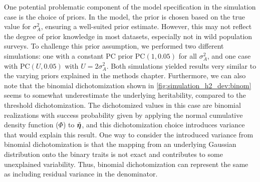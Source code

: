 One potential problematic component of the model specification in the simulation case is the choice of priors. In the model, the prior is chosen based on the true value for $\sigma^2_A$, ensuring a well-suited prior estimate. However, this may not reflect the degree of prior knowledge in most datasets, especially not in wild population surveys. To challenge this prior assumption, we performed two different simulations: one with a constant PC prior PC$(1,0.05)$ for all $\sigma^2_A$, and one case with PC$(U, 0.05)$ with $U=2\sigma^2_A$. Both simulations yielded results very similar to the varying priors explained in the methods chapter. %
Furthermore, we can also note that the binomial dichotomization shown in \autoref{fig:simulation_h2_dev:binom} seems to somewhat underestimate the underlying heritability, compared to the threshold dichotomization. The dichotomized values in this case are binomial realizations with success probability given by applying the normal cumulative density function ($\Phi$) to $\Tilde{\bm\eta}$, and this dichotomization choice introduces variance that would explain this result. One way to consider the introduced variance from binomial dichotomization is that the mapping from an underlying Gaussian distribution onto the binary traits is not exact and contributes to some unexplained variability. Thus, binomial dichotomization can represent the same as including residual variance in the denominator.

